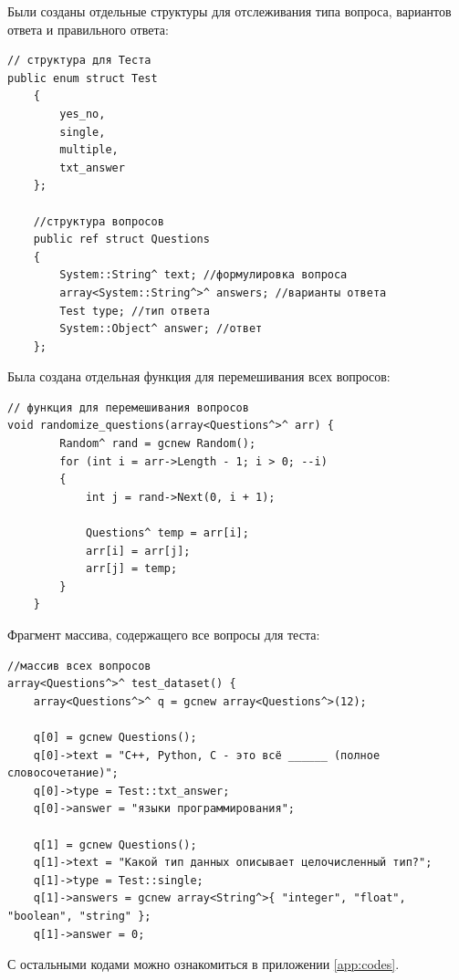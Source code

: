 Были созданы отдельные структуры для отслеживания типа вопроса, \newline вариантов ответа и правильного ответа:
\begin{verbatim}
// структура для Теста
public enum struct Test
    {
        yes_no,
        single,
        multiple,
        txt_answer
    };

    //структура вопросов
    public ref struct Questions
    {
        System::String^ text; //формулировка вопроса
        array<System::String^>^ answers; //варианты ответа
        Test type; //тип ответа
        System::Object^ answer; //ответ 
    };
\end{verbatim}

Была создана отдельная функция для перемешивания всех вопросов:
\begin{verbatim}
// функция для перемешивания вопросов
void randomize_questions(array<Questions^>^ arr) {
        Random^ rand = gcnew Random();
        for (int i = arr->Length - 1; i > 0; --i)
        {
            int j = rand->Next(0, i + 1);

            Questions^ temp = arr[i];
            arr[i] = arr[j];
            arr[j] = temp;
        }
    }
\end{verbatim}

Фрагмент массива, содержащего все вопросы для теста:
\begin{verbatim}
//массив всех вопросов 
array<Questions^>^ test_dataset() {
    array<Questions^>^ q = gcnew array<Questions^>(12);

    q[0] = gcnew Questions();
    q[0]->text = "C++, Python, C - это всё ______ (полное словосочетание)";
    q[0]->type = Test::txt_answer;
    q[0]->answer = "языки программирования";

    q[1] = gcnew Questions();
    q[1]->text = "Какой тип данных описывает целочисленный тип?";
    q[1]->type = Test::single;
    q[1]->answers = gcnew array<String^>{ "integer", "float", "boolean", "string" };
    q[1]->answer = 0;
\end{verbatim}

С остальными кодами можно ознакомиться в приложении \ref{app:codes}.

